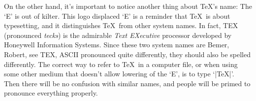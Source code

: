On the other hand, it's important to notice another thing about \TeX's name:
The `E' is out of kilter. This {logo}
displaced `E' is a reminder that \TeX\ is about typesetting, and it
distinguishes \TeX\ from other system names. In fact, {TEX} (pronounced
{\sl tecks\/}) is the admirable {\sl Text EXecutive\/} processor developed by
{Honeywell Information Systems}. Since these two system names are
{Bemer, Robert, see TEX, ASCII}
pronounced quite differently, they should also be spelled differently. The
correct way to refer to \TeX\ in a computer file, or when using some other
medium that doesn't allow lowering of the `E', is to type `|TeX|'. Then
there will be no confusion with similar names, and people will be
primed to pronounce everything properly.